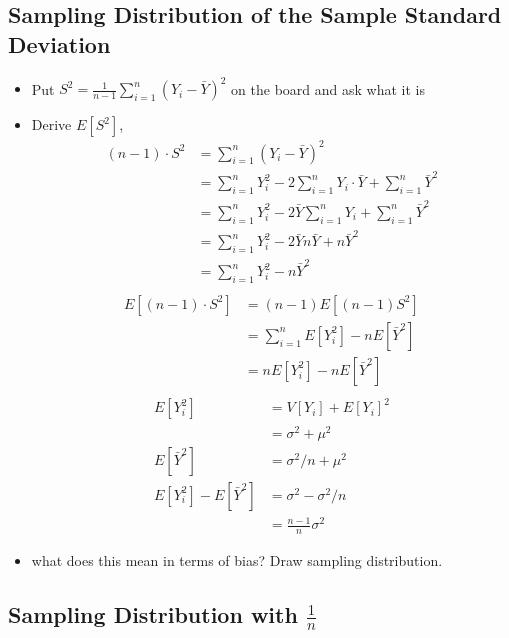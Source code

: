 \documentclass[10pt,letter]{article}
\begin{document}
\subsection*{Sampling Distribution of the Sample Standard Deviation}
\begin{itemize}
\item Put $S^2 = \frac{1}{n-1}\sum_{i=1}^n (Y_i-\bar{Y})^2$ on the board and ask what it is
\item Derive $E[S^2]$, 
\begin{align*}
(n-1)\cdot S^2 &= \sum_{i=1}^n (Y_i-\bar{Y})^2 \\
&= \sum_{i=1}^n Y_i^2 -  2\sum_{i=1}^n Y_i\cdot \bar{Y} +  \sum_{i=1}^n \bar{Y}^2\\
&= \sum_{i=1}^n Y_i^2 - 2 \bar{Y} \sum_{i=1}^n Y_i  +  \sum_{i=1}^n \bar{Y}^2\\
&= \sum_{i=1}^n Y_i^2 - 2 \bar{Y} n \bar{Y}  +  n \bar{Y}^2\\
&= \sum_{i=1}^n Y_i^2 -   n \bar{Y}^2\\
\end{align*}
\begin{align*}
E[(n-1)\cdot S^2] &= (n-1)E[(n-1) S^2] \\
&= \sum_{i=1}^n E[Y_i^2] -   n E[\bar{Y}^2]\\
&= n E[Y_i^2] -   n E[\bar{Y}^2]\\
\end{align*}
\begin{align*}
E[Y_i^2] &= V[Y_i] + E[Y_i]^2\\
&= \sigma^2 + \mu^2 \\ 
E[\bar{Y}^2] &= \sigma^2/n + \mu^2 \\
E[Y_i^2]  - E[\bar{Y}^2] &= \sigma^2 - \sigma^2/n \\
&= \frac{n-1}{n} \sigma^2
\end{align*}

\item what does this mean in terms of bias? Draw sampling distribution.

\end{itemize}

\subsection*{Sampling Distribution with $\frac{1}{n}$}
\end{document}
